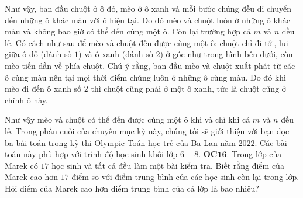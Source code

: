 \begin{multicols}{2}
	\begin{figure}[H]
		\vspace*{-5pt}
		\centering
		\captionsetup{labelformat= empty, justification=centering}
		\vspace*{-5pt}
	\end{figure}
	Như vậy, ban đầu chuột ở ô đỏ, mèo ở ô xanh và mỗi bước chúng đều di chuyển đến những ô khác màu với ô hiện tại. Do đó mèo và chuột luôn ở những ô khác màu và không bao giờ có thể đến cùng một ô.
	\vskip 0.1cm
	Còn lại trường hợp cả $m$ và $n$ đều lẻ. Có cách như sau để mèo và chuột đến được cùng một ô: chuột chỉ đi tới, lui giữa ô đỏ (đánh số $1$) và ô xanh (đánh số $2$) ở góc như trong hình bên dưới, còn mèo tiến dần về phía chuột. 
	\vskip 0.1cm
	Chú ý rằng, ban đầu mèo và chuột xuất phát từ các ô cùng màu nên tại mọi thời điểm chúng luôn ở những ô  cùng màu. Do đó khi mèo đi đến ô xanh số $2$ thì chuột cũng phải ở một ô xanh, tức là chuột cũng ở chính ô này. 
	\begin{figure}[H]
		\vspace*{5pt}
		\centering
		\captionsetup{labelformat= empty, justification=centering}
		\vspace*{-5pt}
	\end{figure}
	Như vậy mèo và chuột có thể đến được cùng một ô khi và chỉ khi cả $m$ và $n$ đều lẻ. 
	\vskip 0.1cm
	Trong phần cuối của chuyên mục kỳ này, chúng tôi sẽ giới thiệu với bạn đọc ba bài toán trong kỳ thi Olympic Toán học trẻ của Ba Lan năm $2022$. Các bài toán này phù hợp với trình độ học sinh khối lớp $6-8$.
	\vskip 0.1cm
	{\bf\color{cackithi} OC$\pmb{16.}$}  Trong lớp của Marek có $17$ học sinh và tất cả đều làm một bài kiểm tra. Biết rằng điểm của Marek cao hơn $17$ điểm so với điểm trung bình của các học sinh còn lại trong lớp. Hỏi điểm của Marek cao hơn điểm trung bình của cả lớp là bao nhiêu?

\end{multicols}
